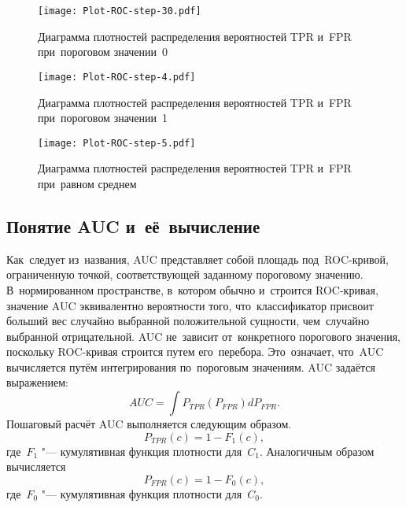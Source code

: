 \documentclass[]{scrreprt}
\begin{document}
\clearpage
%
\begin{figure}[ht]
	\centering
	\texttt{[image: Plot-ROC-step-30.pdf]}
	\caption{Диаграмма плотностей распределения вероятностей TPR и~FPR при~пороговом значении~0}
	\label{fig:plot-TPR-FPR-prob-density-3}
\end{figure}
%
\begin{figure}[ht]
	\centering
	\texttt{[image: Plot-ROC-step-4.pdf]}
	\caption{Диаграмма плотностей распределения вероятностей TPR и~FPR при~пороговом значении~1}
	\label{fig:plot-TPR-FPR-prob-density-4}
\end{figure}
%
\begin{figure}[ht]
	\centering
	\texttt{[image: Plot-ROC-step-5.pdf]}
	\caption{Диаграмма плотностей распределения вероятностей TPR и~FPR при~равном среднем}
	\label{fig:plot-TPR-FPR-prob-density-5}
\end{figure}
%
\subsection{Понятие AUC и~её~вычисление}
Как~следует из~названия, AUC представляет собой площадь под~ROC-кривой, ограниченную точкой, соответствующей заданному пороговому значению. В~нормированном пространстве, в~котором обычно и~строится ROC-кривая, значение AUC эквивалентно вероятности того, что~классификатор присвоит больший вес случайно выбранной положительной сущности, чем~случайно выбранной отрицательной. AUC не~зависит от~конкретного порогового значения, поскольку ROC-кривая строится путем его~перебора. Это~означает, что~AUC вычисляется путём интегрирования по~пороговым значениям. AUC задаётся выражением:
\begin{equation}\label{eq:AUC-computation-0}
AUC = \int P_{TPR}(P_{FPR}) d P_{FPR}.
\end{equation}
Пошаговый расчёт AUC выполняется следующим образом.
\begin{equation}\label{eq:AUC-computation-1}
P_{TPR}(c) = 1 - F_{1}(c),
\end{equation}
где~$F_{1}$ "--- кумулятивная функция плотности для~$C_{1}$. Аналогичным образом вычисляется
\begin{equation}\label{eq:AUC-computation-2}
P_{FPR}(c) = 1 - F_{0}(c),
\end{equation}
где~$F_{0}$ "--- кумулятивная функция плотности для~$C_{0}$.
\end{document}
